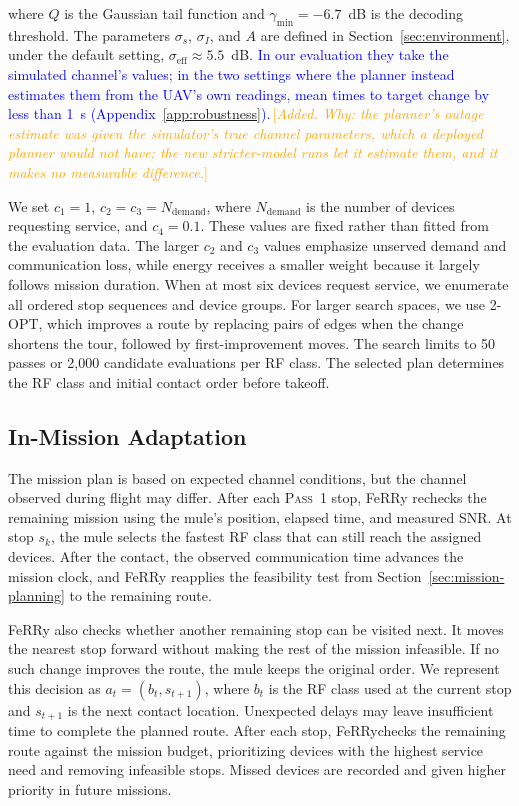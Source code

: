 \documentclass[conference]{IEEEtran}
\newcommand{\sysname}{FeRRy}
\newcommand{\changenote}[1]{\textcolor{orange}{\,[\emph{#1}]}}
\begin{document}
where $Q$ is the Gaussian tail function and
$\gamma_{\min}=-6.7$~dB is the decoding threshold. The parameters
$\sigma_s$, $\sigma_I$, and $A$ are defined in
Section~\ref{sec:environment}, under the default setting,
$\sigma_{\mathrm{eff}}\approx5.5$~dB. \textcolor{blue}{In our evaluation they take
the simulated channel's values; in the two settings where the planner instead
estimates them from the UAV's own readings, mean times to target change by less
than 1~s (Appendix~\ref{app:robustness}).}\changenote{Added. Why: the planner's outage estimate was given the simulator's true channel parameters, which a deployed planner would not have; the new stricter-model runs let it estimate them, and it makes no measurable difference.}

We set $c_1=1$, $c_2=c_3=N_{\mathrm{demand}}$, where
$N_{\mathrm{demand}}$ is the number of devices requesting service, and
$c_4=0.1$. These values are fixed rather than fitted from the evaluation data.
The larger $c_2$ and $c_3$ values emphasize
unserved demand and communication loss, while energy receives a smaller weight
because it largely follows mission duration. When at most six devices request service, we enumerate all ordered stop
sequences and device groups. For larger search spaces, we use 2-OPT, which improves a route by
replacing pairs of edges when the change shortens the tour, followed by
first-improvement moves. The search limits to 50 passes or 2,000
candidate evaluations per RF class. The selected plan determines the RF
class and initial contact order before takeoff.

\subsection{In-Mission Adaptation}
\label{sec:inmission}

The mission plan is based on expected channel conditions, but the channel
observed during flight may differ. After each \textsc{Pass~1} stop, \sysname{} rechecks the remaining
mission using the mule's position, elapsed time, and measured SNR. At stop $s_k$, the mule selects the fastest RF class that can still reach the assigned
devices. After the contact, the observed communication time
advances the mission clock, and \sysname{} reapplies the feasibility test from
Section~\ref{sec:mission-planning} to the remaining route.

\sysname{} also checks whether another remaining stop can be visited next. It
moves the nearest stop forward without making the rest of
the mission infeasible. If no such change improves the route, the mule keeps the
original order. We represent this decision as $a_t=(b_t,s_{t+1})$, where $b_t$ is the RF class used at the current stop and $s_{t+1}$ is the next
contact location. Unexpected delays may leave insufficient time to complete the planned route. After each stop, \sysname checks the remaining route against the mission budget, prioritizing devices with the highest service need and removing infeasible stops. Missed devices are recorded and given higher priority in future missions.
\end{document}
